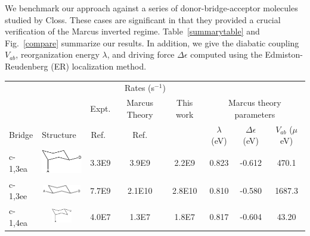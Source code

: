  We  benchmark our approach against a series of donor-bridge-acceptor
molecules studied by Closs\cite{closs1988determination,closs1988intramolecular,closs1989connection}.
These cases are significant in that they provided a crucial verification of the Marcus inverted regime.
Table~\ref{summarytable} and Fig.~\ref{compare}  summarize our results.
In addition, we give the diabatic coupling $V_{ab}$, reorganization energy $\lambda$, and driving force $\Delta \epsilon$
computed using the Edmiston-Reudenberg (ER) localization method.

\begin{table}
\begin{centering}
\begin{tabular}{llccc|ccc}
\hline \hline
 & & \multicolumn{3}{c}{Rates (s$^{-1}$) }& \\
                &                                                                &   Expt.                 &        Marcus Theory   & This work      & \multicolumn{3}{c}{Marcus theory parameters} \\
 Bridge   &  Structure                                                &        Ref.~\cite{closs1988determination,closs1989connection} &              Ref. \cite{subotnik2010predicting}  &                  &      $\lambda$ (eV)  &  $\Delta \epsilon$ (eV)  &  $V_{ab}$ ($\mu$eV) \\
\hline
 c-1,3ea  &  \includegraphics[height=.60cm,width=2cm]{Chapters/chap2/Table1-c13ea.pdf}  &                     3.3E9  &                     3.9E9  &          2.2E9  &           0.823  &           -0.612  &      470.1  \\
\hline
 c-1,3ee  &  \includegraphics[height=0.4cm,width=2cm]{Chapters/chap2/Table1-c13ee.pdf}  &                     7.7E9  &                    2.1E10  &         2.8E10  &           0.810  &           -0.580  &     1687.3  \\
\hline
 c-1,4ea  &  \includegraphics[height=0.6cm,width=2cm]{Chapters/chap2/Table1-c14ea.pdf}  &                     4.0E7  &                     1.3E7  &          1.8E7  &           0.817  &           -0.604  &      43.20 \\

\end{tabular}
\end{centering}
\end{table}
